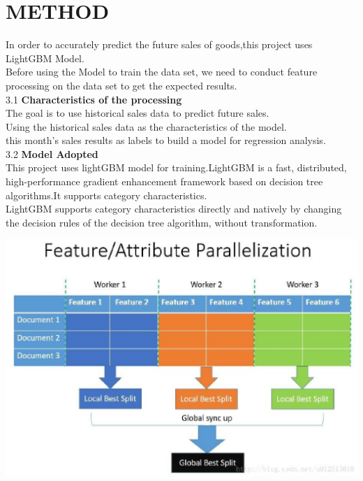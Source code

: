

  




\section{METHOD} \label{sec-experiment}
\indent In order to accurately predict the future sales of goods,this project uses LightGBM Model. \\
Before using the Model to train the data set, we need to conduct feature processing on the data set to get the expected results. \\
3.1 \textbf{Characteristics of the processing}\\
The goal is to use historical sales data to predict future sales.\\
Using the historical sales data as the characteristics of the model.\\
 this month's sales results as labels to build a model for regression analysis.\\
 3.2 \textbf{Model Adopted}\\
 This project uses lightGBM model for training.LightGBM is a fast, 
distributed, high-performance gradient enhancement framework based on 
decision tree algorithms.It supports category characteristics. \\
\indent LightGBM supports category characteristics directly and natively
by changing the decision rules of the decision tree algorithm, without transformation.
\begin{center}
  \begin{minipage}{0.5\linewidth}
  \centering
  \includegraphics[width=1.1\textwidth]{logos/moxing.eps}
  \centering
  \end{minipage}
\end{center}

